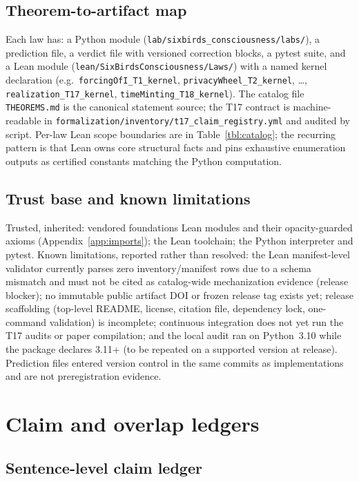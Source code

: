 \documentclass[11pt]{article}
\theoremstyle{definition}
\begin{document}
\subsection{Theorem-to-artifact map}

Each law has: a Python module
(\texttt{lab/sixbirds\_consciousness/labs/}), a prediction file, a verdict
file with versioned correction blocks, a pytest suite, and a Lean module
(\texttt{lean/SixBirdsConsciousness/Laws/}) with a named kernel declaration
(e.g.\ \texttt{forcingOfI\_T1\_kernel}, \texttt{privacyWheel\_T2\_kernel},
\dots, \texttt{realization\_T17\_kernel}, \texttt{timeMinting\_T18\_kernel}).
The catalog file \texttt{THEOREMS.md} is the canonical statement source; the
T17 contract is machine-readable in
\texttt{formalization/inventory/t17\_claim\_registry.yml} and audited by
script. Per-law Lean scope boundaries are in Table~\ref{tbl:catalog}; the
recurring pattern is that Lean owns core structural facts and pins exhaustive
enumeration outputs as certified constants matching the Python computation.

\subsection{Trust base and known limitations}

Trusted, inherited: vendored foundations Lean modules and their
opacity-guarded axioms (Appendix~\ref{app:imports}); the Lean toolchain; the
Python interpreter and pytest. Known limitations, reported rather than
resolved: the Lean manifest-level validator currently parses zero
inventory/manifest rows due to a schema mismatch and must not be cited as
catalog-wide mechanization evidence (release blocker); no immutable public
artifact DOI or frozen release tag exists yet; release scaffolding (top-level
README, license, citation file, dependency lock, one-command validation) is
incomplete; continuous integration does not yet run the T17 audits or paper
compilation; and the local audit ran on Python~3.10 while the package
declares 3.11+ (to be repeated on a supported version at release). Prediction
files entered version control in the same commits as implementations and are
not preregistration evidence.

 \section{Claim and overlap ledgers}
\label{app:ledgers}


\subsection{Sentence-level claim ledger}
\end{document}
